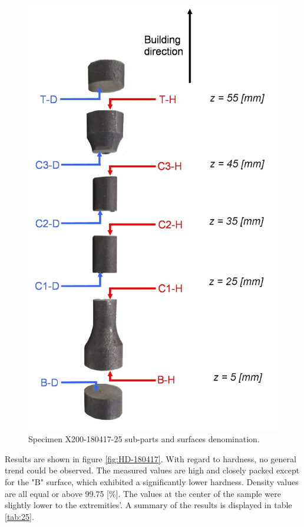 \begin{figure}[ht]
\centering
\centerline{\includegraphics[scale=0.23]{Images/Saus}}
\decoRule
\caption[Specimen X200-180417-25 sub-parts and surfaces denomination]{Specimen X200-180417-25 sub-parts and surfaces denomination.}
\label{fig:saus}
\end{figure}

Results are shown in figure \ref{fig:HD-180417}. With regard to hardness, no general trend could be observed. The measured values are high and closely packed except for the "B" surface, which exhibited a significantly lower hardness. Density values are all equal or above 99.75 [\%]. The values at the center of the sample were slightly lower to the extremities'. A summary of the results is displayed in table \ref{tab:25}.


